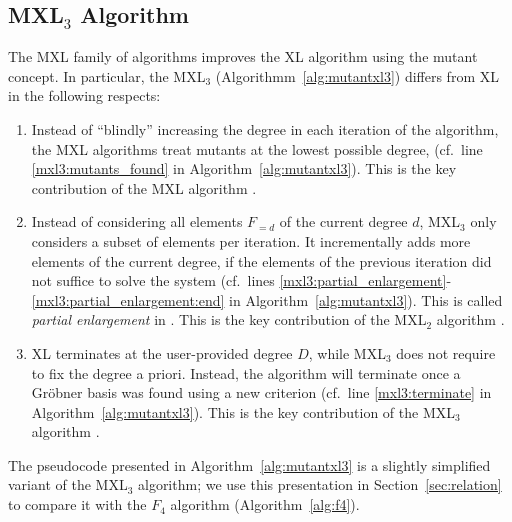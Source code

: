 \subsection{MXL$_3$ Algorithm} \label{sec:mxl3}
The MXL family of algorithms improves the XL algorithm using the mutant concept. In particular, the MXL$_3$ (Algorithmm~\ref{alg:mutantxl3}) differs from XL in the following respects:
\begin{enumerate}
 \item Instead of ``blindly'' increasing the degree in each iteration of the algorithm, the MXL algorithms treat mutants at the lowest possible degree, (cf.\ line \ref{mxl3:mutants_found} in Algorithm~\ref{alg:mutantxl3}). This is the key contribution of the MXL algorithm \cite{mxl}.
 \item Instead of considering all elements $F_{=d}$ of the current degree $d$, MXL$_3$ only considers a subset of elements per iteration. It incrementally adds more elements of the current degree, if the elements of the previous iteration did not suffice to solve the system (cf.\ lines \ref{mxl3:partial_enlargement}-\ref{mxl3:partial_enlargement:end} in Algorithm~\ref{alg:mutantxl3}). This is called {\it partial enlargement} in \cite{mxl2,mxl3}. This is the key contribution of the MXL$_2$ algorithm \cite{mxl2}.
 \item XL terminates at the user-provided degree $D$, while MXL$_3$ does not require to fix the degree a priori. Instead, the algorithm will terminate once a Gröbner basis was found using a new criterion (cf.\ line \ref{mxl3:terminate} in Algorithm~\ref{alg:mutantxl3}). This is the key contribution of the MXL$_3$ algorithm \cite{mxl3}.
\end{enumerate}
The pseudocode presented in Algorithm~\ref{alg:mutantxl3} is a slightly simplified variant of the MXL$_3$ algorithm; we use this presentation in Section~\ref{sec:relation} to compare it with the $F_4$ algorithm (Algorithm~\ref{alg:f4}).


